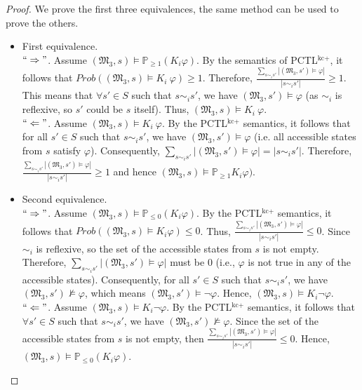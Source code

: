 \begin{proof} %
We prove the first three equivalences, the same method can be used to prove the others.
\begin{itemize}
\item First equivalence. ~\\
    $``\Rightarrow"$. Assume $(\mathfrak{M_3},s)\models \mathbb{P}_{\geq1} (K_i\varphi)$.
    By the semantics of PCTL$^{\textrm{kc+}}$, it follows that $Prob((\mathfrak{M_3},s)\models K_i~\varphi)\geq1$.
    Therefore, $\frac{\sum_{s\sim_i s'}|(\mathfrak{M_3},s')\models \varphi| }{|s\sim_i s'|}\geq1$. This means that $\forall s'\in S$ such that $s\sim_i s'$, we have $(\mathfrak{M_3},s')\models \varphi$ (as $\sim_i$ is reflexive, so $s'$ could be $s$ itself). Thus, $(\mathfrak{M_3},s) \models K_i ~\varphi$. \\
    $``\Leftarrow"$. Assume $(\mathfrak{M_3},s)\models K_i~\varphi$. By the PCTL$^{\textrm{kc+}}$ semantics, it follows that for all $s'\in S$ such that $s\sim_i s'$, we have $(\mathfrak{M_3},s')\models \varphi$ (i.e. all accessible states from $s$ satisfy $\varphi$).
    Consequently, $\sum_{s\sim_i s'}|(\mathfrak{M_3},s')\models \varphi| = |s\sim_i s'|$.
    Therefore, $\frac{\sum_{s\sim_i s'}|(\mathfrak{M_3},s')\models \varphi| }{|s\sim_i s'|}\geq1$ and hence $(\mathfrak{M_3},s)\models \mathbb{P}_{\geq1} K_i\varphi)$.

\item Second equivalence. ~\\
    $``\Rightarrow"$. Assume $(\mathfrak{M_3},s)\models \mathbb{P}_{\leq0} (K_i\varphi)$.
    By the PCTL$^{\textrm{kc+}}$ semantics, it follows that $Prob((\mathfrak{M_3},s)\models K_i\varphi)\leq0$.
    Thus, $\frac{\sum_{s\sim_i s'}|(\mathfrak{M_3},s')\models \varphi|}{|s\sim_i s'|}\leq0$. Since $\sim_i$ is reflexive, so the set of the accessible states from $s$ is not empty. Therefore, $\sum_{s\sim_i s'}|(\mathfrak{M_3},s')\models \varphi|$ must be 0 (i.e., $\varphi$ is not true in any of the accessible states). Consequently, for all $s'\in S$ such that $s\sim_i s'$, we have $(\mathfrak{M_3},s')\nvDash \varphi$, which means $(\mathfrak{M_3},s')\models \neg \varphi$. Hence, $(\mathfrak{M_3},s)\models K_i \neg \varphi$.~\\
%
    $``\Leftarrow"$. Assume $(\mathfrak{M_3},s)\models K_i\neg \varphi$. By the PCTL$^{\textrm{kc+}}$ semantics, it follows that $\forall s'\in S$ such that $s\sim_i s'$, we have $(\mathfrak{M_3},s')\nvDash \varphi$. Since the set of the accessible states from $s$ is not empty, then $\frac{\sum_{s\sim_i s'}|(\mathfrak{M_3},s')\models \varphi| }{|s\sim_i s'|}\leq0$. Hence, $(\mathfrak{M_3},s)\models \mathbb{P}_{\leq0} (K_i\varphi)$.


\end{itemize}
\end{proof}
